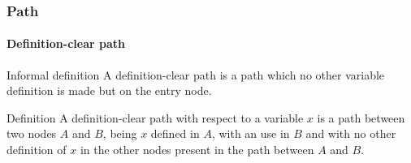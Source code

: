 \begin{frame}
\frametitle{Path}
\framesubtitle{Definition-clear path}
\label{concept:definition-clear-path}

\begin{block:concept}{Informal definition}
A definition-clear path is a path which no other variable definition is made but
on the entry node.
\end{block:concept}

\begin{block:concept}{Definition}
A definition-clear path with respect to a variable $x$ is a path between two
nodes $A$ and $B$, being $x$ defined in $A$, with an use in $B$ and with no
other definition of $x$ in the other nodes present in the path between $A$ and
$B$.
\end{block:concept}

\hfill
{}
\end{frame}